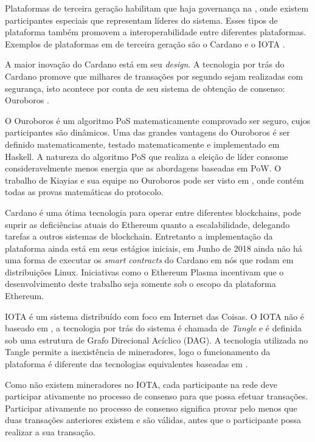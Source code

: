 \documentclass[tcc,capa]{texufpel}
\begin{document}
    Plataformas de terceira geração habilitam que haja governança na \bchain, onde existem participantes especiais que representam líderes do sistema. Esses tipos de plataforma também promovem a interoperabilidade entre diferentes plataformas. Exemplos de plataformas em \bchain de terceira geração são o Cardano e o IOTA \cite{spurjeonsurvey}.
    
    A maior inovação do Cardano está em seu \textit{design}. A tecnologia por trás do Cardano promove que milhares de transações por segundo sejam realizadas com segurança, isto acontece por conta de seu sistema de obtenção de consenso: Ouroboros \cite{kiayias2017ouroboros}.
    
    O Ouroboros é um algoritmo PoS matematicamente comprovado ser seguro, cujos participantes são dinâmicos. Uma das grandes vantagens do Ouroboros é ser definido matematicamente, testado matematicamente e implementado em Haskell. A natureza do algoritmo PoS que realiza a eleição de líder consome consideravelmente menos energia que as abordagens baseadas em PoW. O trabalho de Kiayias e sua equipe no Ouroboros pode ser visto em \cite{kiayias2017ouroboros}, onde contém todas as provas matemáticas do protocolo. 
    
    Cardano é uma ótima tecnologia para operar entre diferentes blockchains, pode suprir as deficiências atuais do Ethereum quanto a escalabilidade, delegando tarefas a outros sistemas de blockchain. Entretanto a implementação da plataforma ainda está em seus estágios iniciais, em Junho de 2018 ainda não há uma forma de executar os \textit{smart contracts} do Cardano em nós que rodam em distribuições Linux. Iniciativas como o Ethereum Plasma incentivam que o desenvolvimento deste trabalho seja somente sob o escopo da plataforma Ethereum.
    
    IOTA é um sistema distribuído com foco em Internet das Coisas. O IOTA não é baseado em \bchain, a tecnologia por trás do sistema é chamada de \textit{Tangle} e é definida sob uma estrutura de Grafo Direcional Acíclico (DAG). A tecnologia utilizada no Tangle permite a inexistência de mineradores, logo o funcionamento da plataforma é diferente das tecnologias equivalentes baseadas em \bchain.
    
    Como não existem mineradores no IOTA, cada participante na rede deve participar ativamente no processo de consenso para que possa efetuar transações. Participar ativamente no processo de consenso significa provar pelo menos que duas transações anteriores existem e são válidas, antes que o participante possa realizar a sua transação.
    
\end{document}
